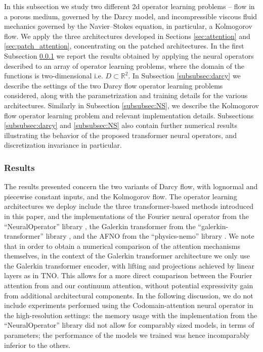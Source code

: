 \documentclass[twoside]{article}
\newcommand{\1}{\mathbbm{1}}
\newcommand{\R}{\mathbbm{R}}
\providecommand{\mathbbm}{\mathbb} %
\begin{document}
In this subsection we study two different 2d operator learning problems -- flow in a porous medium, 
governed by the Darcy model, and incompressible viscous fluid mechanics governed by the Navier--Stokes
equation, in particular, a Kolmogorov flow. We apply the three architectures developed in
Sections \ref{sec:attention} and \ref{sec:patch_attention}, concentrating on the patched architectures. 
In the first Subsection \ref{subsec:2dr}
we report the results obtained by applying the neural operators described to an array of operator learning problems, where the domain of the functions is two-dimensional i.e. $D\subset \R^2$. 
In Subsection \ref{subsubsec:darcy} we describe the settings of the two Darcy flow operator learning problems considered, along with the parametrization and training details for the various architectures. Similarly in Subsection \ref{subsubsec:NS}, we describe the Kolmogorov flow operator learning problem and relevant implementation details. Subsections \ref{subsubsec:darcy} and \ref{subsubsec:NS} also contain further
numerical results illustrating the behavior of the proposed transformer neural operators,
and discretization invariance in particular.


\subsubsection{Results}
\label{subsec:2dr}

The results presented concern the two variants of Darcy flow, with lognormal and piecewise constant
inputs, and the Kolmogorov flow. The operator learning architectures we deploy include the three
transformer-based methods introduced in this paper, and the implementations of 
the Fourier neural operator from the ``NeuralOperator'' library \citep{li2021fourier,kovachki2023neural}, the Galerkin transformer from the ``galerkin-transformer'' library \citep{cao2021choose}, and the AFNO \citep{guibas2022efficient} from the ``physics-nemo'' library \citep{physicsnemo2023}. We note that in order to obtain a numerical comparison of the attention mechanisms themselves, in the context of the Galerkin transformer architecture we only use the Galerkin transformer encoder, with lifting and projections achieved by linear layers as in TNO. This allows for a more direct comparison between the Fourier attention from \citet{cao2021choose} and our continuum attention, without potential expressivity gain from additional architectural components. In the following discussion, we do not include experiments performed using  the Codomain-attention neural operator \citep{rahman2024pretraining} in the high-resolution settings: the memory usage with the implementation from the ``NeuralOperator'' library did not allow for comparably sized models, in terms of parameters; the performance of the models we trained was hence incomparably inferior to the others.
\end{document}
